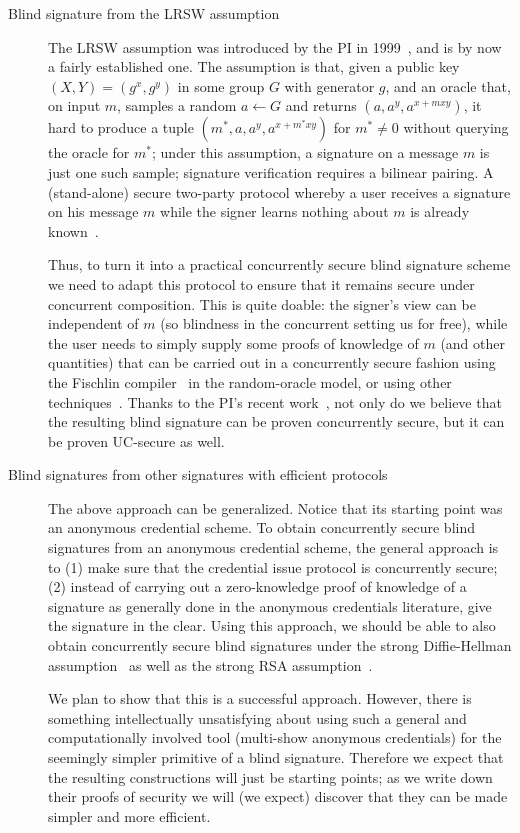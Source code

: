 \begin{description}
\item[Blind signature from the LRSW assumption] The LRSW assumption was introduced by the PI in 1999~\cite{SAC:lrsw99,lysyan99}, and is by now a fairly established one.  The assumption is that, given a public key $(X,Y)= (g^x,g^y)$ in some group $G$ with generator $g$, and an oracle that, on input $m$, samples a random $a\leftarrow G$ and returns $(a,a^y,a^{x+mxy})$, it hard to produce a tuple $(m^*,a,a^y,a^{x+m^*xy})$ for $m^*\neq 0$ without querying the oracle for $m^*$; under this assumption, a signature on a message $m$ is just one such sample; signature verification requires a bilinear pairing.  A (stand-alone) secure two-party protocol whereby a user receives a signature on his message $m$ while the signer learns nothing about $m$ is already known~\cite{C:CamLys04}.  

Thus, to turn it into a practical concurrently secure blind signature scheme we need to adapt this protocol to ensure that it remains secure under concurrent composition.  This is quite doable: the signer's view can be independent of $m$ (so blindness in the concurrent setting us for free), while the user needs to simply supply some proofs of knowledge of $m$ (and other quantities) that can be carried out in a concurrently secure fashion using the Fischlin compiler~\cite{C:Fischlin05} in the random-oracle model, or using other techniques~\cite{AC:CamDam00,C:CamSho03}. Thanks to the PI's recent work~\cite{lysros22}, not only do we believe that the resulting blind signature can be proven concurrently secure, but it can be proven UC-secure as well. 

\item[Blind signatures from other signatures with efficient protocols]  The above approach can be generalized.  Notice that its starting point was an anonymous credential scheme. To obtain concurrently secure blind signatures from an anonymous credential scheme, the general approach is to (1) make sure that the credential issue protocol is concurrently secure; (2) instead of carrying out a zero-knowledge proof of knowledge of a signature as generally done in the anonymous credentials literature, give the signature in the clear.  Using this approach, we should be able to also obtain concurrently secure blind signatures under the strong Diffie-Hellman assumption~\cite{EPRINT:CamDriLeh16} as well as the strong RSA assumption~\cite{lysyan02a,SCN:CamLys02}.  

We plan to show that this is a successful approach.  However, there is something intellectually unsatisfying about using such a general and computationally involved tool (multi-show anonymous credentials) for the seemingly simpler primitive of a blind signature.  Therefore we expect that the resulting constructions will just be starting points; as we write down their proofs of security we will (we expect) discover that they can be made simpler and more efficient.


\end{description}
